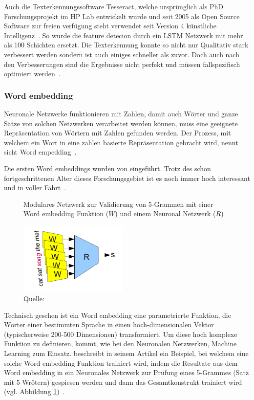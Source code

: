 \documentclass{hwz}
\begin{document}
Auch die Texterkennungssoftware Tesseract, welche ursprünglich als PhD Forschungsprojekt im HP Lab entwickelt wurde und seit 2005 als Open Source Software zur freien verfügung steht verwendet seit Version 4 künstliche Intelligenz~\autocite{Smith2007AnEngine, o.V.20184.0LSTM}. So wurde die feature detecion durch ein LSTM Netzwerk mit mehr als 100 Schichten ersetzt. Die Texterkennung konnte so nicht nur Qualitativ stark verbessert werden sondern ist auch einiges schneller als zuvor. Doch auch nach den Verbesserungen sind die Ergebnisse nicht perfekt und müssen fallspezifisch optimiert werden~\autocite{o.V.20184.0Performance, o.V.20184.0LSTM}.

\subsubsection{Word embedding}

Neuronale Netzwerke funktionieren mit Zahlen, damit auch Wörter und ganze Sätze von solchen Netzwerken verarbeitet werden können, muss eine geeignete Repräsentation von Wörtern mit Zahlen gefunden werden. Der Prozess, mit welchem ein Wort in eine zahlen basierte Repräsentation gebracht wird, nennt sicht Word empedding~\autocite{Olah2014DeepRepresentations}.

Die ersten Word embeddings wurden von \textcite{Bengio2001Advances13} eingeführt. Trotz des schon fortgeschrittenen Alter dieses Forschungsgebiet ist es noch immer hoch interessant und in voller Fahrt~\autocite{Olah2014DeepRepresentations}.

\begin{figure} 
    \caption{Modulares Netzwerk zur Validierung von 5-Grammen mit einer Word embedding Funktion ($W$) und einem Neuronal Netzwerk ($R$)}
    \label{wordembeddingtraining}
    \centering
    \includegraphics[width=0.48\textwidth]{graphics/wordembeddingtraining.png}
    \caption*{Quelle: \textcite{Olah2014DeepRepresentations}}
\end{figure}
Technisch gesehen ist ein Word embedding eine parametrierte Funktion, die Wörter einer bestimmten Sprache in einen hoch-dimensionalen Vektor (typischerweise 200-500 Dimensionen) transformiert. Um diese hoch komplexe Funktion zu definieren, kommt, wie bei den Neuronalen Netzwerken, Machine Learning zum Einsatz. \textcite{Olah2014NeuralTopology} beschreibt in seinem Artikel ein Beispiel, bei welchem eine solche Word embedding Funktion trainiert wird, indem die Resultate aus dem Word embedding in ein Neuronales Netzwerk zur Prüfung eines 5-Grammes (Satz mit 5 Wrötern) gespiesen werden und dann das Gesamtkonstrukt trainiert wird (vgl. Abbildung \ref{wordembeddingtraining})~\autocite{Olah2014NeuralTopology}.
\end{document}
